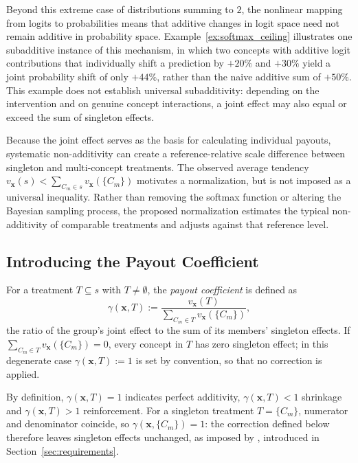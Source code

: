 Beyond this extreme case of distributions summing to $2$, the nonlinear mapping from logits to probabilities means that additive changes in logit space need not remain additive in probability space. Example~\ref{ex:softmax_ceiling} illustrates one subadditive instance of this mechanism, in which two concepts with additive logit contributions that individually shift a prediction by $+20\%$ and $+30\%$ yield a joint probability shift of only $+44\%$, rather than the naive additive sum of $+50\%$. This example does not establish universal subadditivity: depending on the intervention and on genuine concept interactions, a joint effect may also equal or exceed the sum of singleton effects.

Because the joint effect serves as the basis for calculating individual payouts, systematic non-additivity can create a reference-relative scale difference between singleton and multi-concept treatments. The observed average tendency $v_{\mathbf{x}}(s)<\sum_{C_m\in s}v_{\mathbf{x}}(\{C_m\})$ motivates a normalization, but is not imposed as a universal inequality. Rather than removing the softmax function or altering the Bayesian sampling process, the proposed normalization estimates the typical non-additivity of comparable treatments and adjusts against that reference level.

\subsection{Introducing the Payout Coefficient}

For a treatment $T \subseteq s$ with $T \neq \emptyset$, the \emph{payout coefficient} is defined as
\begin{equation}
	\label{eq:payout_coefficient}
	\gamma(\mathbf{x},T) := \frac{v_{\mathbf{x}}(T)}{\displaystyle\sum_{C_m \in T} v_{\mathbf{x}}(\{C_m\})},
\end{equation}
the ratio of the group's joint effect to the sum of its members' singleton effects. If $\sum_{C_m\in T} v_{\mathbf{x}}(\{C_m\})=0$, every concept in $T$ has zero singleton effect; in this degenerate case $\gamma(\mathbf{x},T):=1$ is set by convention, so that no correction is applied.

By definition, $\gamma(\mathbf{x},T)=1$ indicates perfect additivity, $\gamma(\mathbf{x},T)<1$ shrinkage and $\gamma(\mathbf{x},T)>1$ reinforcement. For a singleton treatment $T=\{C_m\}$, numerator and denominator coincide, so $\gamma(\mathbf{x},\{C_m\}) = 1$: the correction defined below therefore leaves singleton effects unchanged, as imposed by , introduced in Section~\ref{sec:requirements}.

